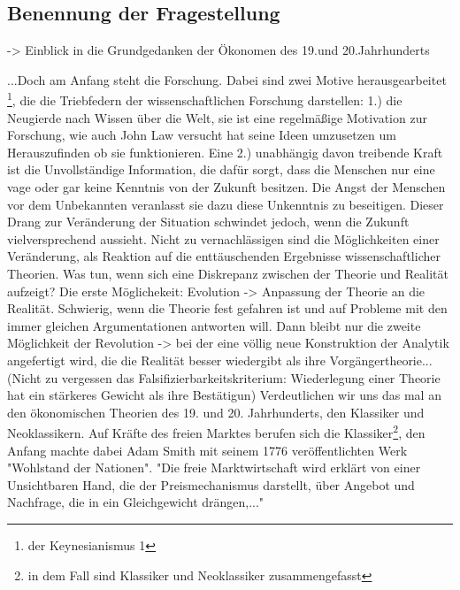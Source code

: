 \documentclass[
onecolumn,
a4paper,
abstracton,
parskip=half
,final
]{scrartcl}
\begin{document}
\subsection{Benennung der Fragestellung}

-> Einblick in die Grundgedanken der {\"O}konomen des 19.und 20.Jahrhunderts

...Doch am Anfang steht die Forschung. Dabei sind zwei Motive herausgearbeitet \footnote[9]{der Keynesianismus 1},
die die Triebfedern der wissenschaftlichen Forschung darstellen:
1.) die Neugierde nach Wissen {\"u}ber die Welt, sie ist eine regelm{\"a}{\ss}ige Motivation zur
 Forschung, wie auch John Law versucht hat seine Ideen umzusetzen um Herauszufinden
 ob sie funktionieren.
Eine 2.) unabh{\"a}ngig davon treibende Kraft ist die Unvollst{\"a}ndige Information, die
daf{\"u}r sorgt, dass die Menschen nur eine vage oder gar keine Kenntnis von der Zukunft
besitzen. Die Angst der Menschen vor dem Unbekannten veranlasst sie dazu diese
Unkenntnis zu beseitigen. Dieser Drang zur Ver{\"a}nderung der Situation schwindet jedoch,
wenn die Zukunft vielversprechend aussieht.
Nicht zu vernachl{\"a}ssigen sind die M{\"o}glichkeiten einer Ver{\"a}nderung, als Reaktion auf
die entt{\"a}uschenden Ergebnisse wissenschaftlicher Theorien. Was tun, wenn sich eine
Diskrepanz zwischen der Theorie und Realit{\"a}t aufzeigt? Die erste M{\"o}glichekeit:
Evolution -> Anpassung der Theorie an die Realit{\"a}t. Schwierig, wenn die Theorie fest
gefahren ist und auf Probleme mit den immer gleichen Argumentationen antworten will.
Dann bleibt nur die zweite M{\"o}glichkeit der Revolution -> bei der eine v{\"o}llig neue
Konstruktion der Analytik angefertigt wird, die die Realit{\"a}t besser wiedergibt als ihre
Vorg{\"a}ngertheorie...
(Nicht zu vergessen das Falsifizierbarkeitskriterium: Wiederlegung einer Theorie hat ein
st{\"a}rkeres Gewicht als ihre Best{\"a}tigun)
Verdeutlichen wir uns das mal an den {\"o}konomischen Theorien des 19. und 20. Jahrhunderts,
den Klassiker und Neoklassikern.
Auf Kr{\"a}fte des freien Marktes berufen sich die Klassiker\footnote[10]{in dem Fall sind Klassiker und Neoklassiker zusammengefasst}, den Anfang machte dabei
 Adam Smith mit seinem 1776 ver{\"o}ffentlichten Werk "Wohlstand der Nationen".
"Die freie Marktwirtschaft wird erkl{\"a}rt von einer Unsichtbaren Hand, die der
Preismechanismus darstellt, {\"u}ber Angebot und Nachfrage, die in ein Gleichgewicht dr{\"a}ngen,..."
\end{document}
